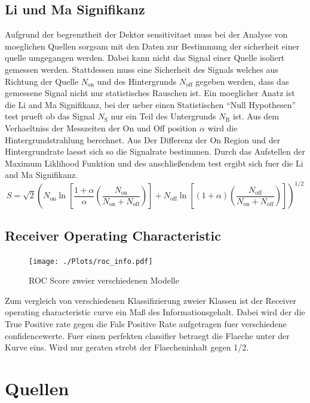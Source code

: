 \subsection{Li und Ma Signifikanz}
Aufgrund der begrenztheit der Dektor sensitivitaet muss bei der Analyse von moeglichen Quellen sorgsam mit den Daten zur Bestimmung der sicherheit einer quelle umgegangen werden. Dabei kann nicht das Signal einer Quelle isoliert gemessen werden. Stattdessen muss eine Sicherheit des Signals welches aus Richtung der Quelle $N_\text{on}$ und des Hintergrunds $N_\text{off}$ gegeben werden, dass das gemessene Signal nicht nur statistisches Rauschen ist. Ein moeglicher Anatz ist die Li and Ma Signifikanz, bei der ueber einen Statistischen ``Null Hypothesen'' test prueft ob das Signal $N_\text{S}$ nur ein Teil des Untergrunds $N_\text{B}$ ist. Aus dem Verhaeltniss der Messzeiten der On und Off position $\alpha$ wird die Hintergrundstrahlung berechnet. Aus Der Differenz der On Region und der Hintergrundrate laesst sich so die Signalrate bestimmen. Durch das Aufstellen der Maximum Liklihood Funktion und des anschließendem test ergibt sich fuer die Li and Ma Signifikanz.
\begin{equation}
S = \sqrt{2} \left( N_\text{on} \ln \left[ \frac{1+ \alpha}{\alpha}\left( \frac{N_\text{on}}{N_\text{on} + N_\text{off}} \right) \right] + N_\text{off} \ln \left[ \left( 1+ \alpha \right) \left( \frac{N_\text{off}}{N_\text{on} + N_\text{off}} \right) \right] \right)^{1/2}
\end{equation}

\subsection{Receiver Operating Characteristic}
\begin{figure}
  \centering
  \texttt{[image: ./Plots/roc\_info.pdf]}
  \caption{ROC Score zweier verschiedenen Modelle}
\end{figure}
Zum vergleich von verschiedenen Klassifizierung zweier Klassen ist der Receiver operating characteristic curve ein Maß des Informationsgehalt. Dabei wird der die True Positive rate gegen die Fals Positive Rate aufgetragen fuer verschiedene confidencewerte. Fuer einen perfekten classifier betraegt die Flaeche unter der Kurve eins. Wird nur geraten strebt der Flaecheninhalt gegen 1/2.

\section{Quellen}

